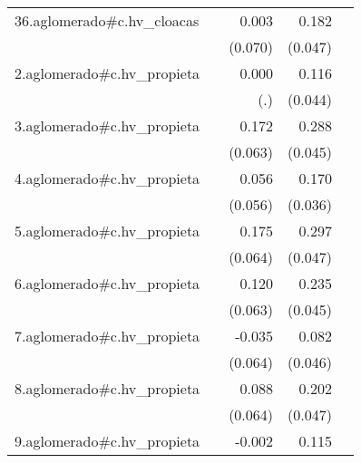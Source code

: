 {\begin{longtable}{l*{4}{D{.}{.}{-1}}}
\addlinespace
36.aglomerado#c.hv\_cloacas&                     &       0.003         &       0.182\sym{***}&                     \\
            &                     &     (0.070)         &     (0.047)         &                     \\
\addlinespace
2.aglomerado#c.hv\_propieta&                     &       0.000         &       0.116\sym{**} &                     \\
            &                     &         (.)         &     (0.044)         &                     \\
\addlinespace
3.aglomerado#c.hv\_propieta&                     &       0.172\sym{**} &       0.288\sym{***}&                     \\
            &                     &     (0.063)         &     (0.045)         &                     \\
\addlinespace
4.aglomerado#c.hv\_propieta&                     &       0.056         &       0.170\sym{***}&                     \\
            &                     &     (0.056)         &     (0.036)         &                     \\
\addlinespace
5.aglomerado#c.hv\_propieta&                     &       0.175\sym{**} &       0.297\sym{***}&                     \\
            &                     &     (0.064)         &     (0.047)         &                     \\
\addlinespace
6.aglomerado#c.hv\_propieta&                     &       0.120         &       0.235\sym{***}&                     \\
            &                     &     (0.063)         &     (0.045)         &                     \\
\addlinespace
7.aglomerado#c.hv\_propieta&                     &      -0.035         &       0.082         &                     \\
            &                     &     (0.064)         &     (0.046)         &                     \\
\addlinespace
8.aglomerado#c.hv\_propieta&                     &       0.088         &       0.202\sym{***}&                     \\
            &                     &     (0.064)         &     (0.047)         &                     \\
\addlinespace
9.aglomerado#c.hv\_propieta&                     &      -0.002         &       0.115\sym{*}  &                     \\

\end{longtable}}
